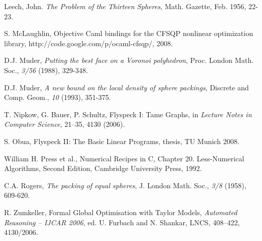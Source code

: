 \documentclass{article} %
\begin{document}
\begin{thebibliography}{HeHa94}
 Leech, John.  {\it The Problem of the Thirteen
Spheres}, Math. Gazette, Feb. 1956, 22-23.

 S. McLaughlin,
Objective Caml bindings for the CFSQP nonlinear optimization library, http://code.google.com/p/ocaml-cfsqp/, 2008.

 D.J. Muder, {\it Putting the best face on a Voronoi
polyhedron}, Proc. London Math. Soc., \emph{3/56} (1988), 329-348.




 D.J. Muder, {\it A new bound on the local density of
sphere packings}, Discrete and Comp. Geom., \emph{10} (1993), 351-375.

  T. Nipkow, G. Bauer, P. Schultz, Flyspeck I: Tame Graphs, in
{\it Lecture Notes in Computer Science}, 21--35, 4130 (2006). 

  S. Obua, Flyspeck II: The Basic Linear Programs,
thesis, TU Munich 2008.

 William H. Press et al., Numerical Recipes in C,
Chapter 20. Less-Numerical Algorithms, Second Edition, Cambridge
University Press, 1992.

 C.A. Rogers, {\it The packing of equal spheres},
J. London Math. Soc., \emph{3/8} (1958), 609-620.



  R. Zumkeller,  Formal Global Optimisation with
 Taylor Models, {\it Automated Reasoning -- IJCAR 2006},
 ed. U. Furbach and N. Shankar, LNCS, 408--422, 4130/2006.


\end{thebibliography}
\end{document}
